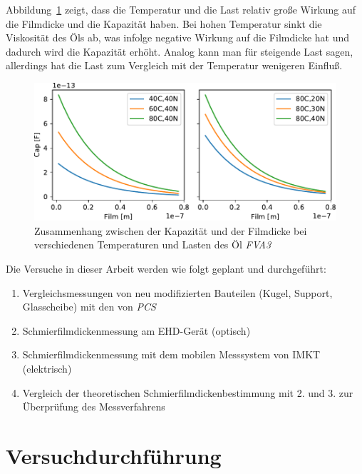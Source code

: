 Abbildung~\ref{fig:film_cap_with_dif_temp_and_load} zeigt, dass die Temperatur und die Last relativ große Wirkung auf die Filmdicke und die Kapazität haben.
Bei hohen Temperatur sinkt die Viskosität des Öls ab, was infolge negative Wirkung auf die Filmdicke hat und dadurch wird die Kapazität erhöht.
Analog kann man für steigende Last sagen, allerdings hat die Last zum Vergleich mit der Temperatur wenigeren Einfluß.
\begin{figure}[htb]
    \centering
    \includegraphics[]{./images/film_cap_with_dif_temp_and_load_fva3.pdf}
    \caption{Zusammenhang zwischen der Kapazität und der Filmdicke bei verschiedenen Temperaturen und Lasten des Öl \textit{FVA3}}
    \label{fig:film_cap_with_dif_temp_and_load}
\end{figure}

Die Versuche in dieser Arbeit werden wie folgt geplant und durchgeführt:
\begin{enumerate}
    \item Vergleichsmessungen von neu modifizierten Bauteilen (Kugel, Support, Glasscheibe) mit den von \textit{PCS}
    \item Schmierfilmdickenmessung am EHD-Gerät (optisch)
    \item Schmierfilmdickenmessung mit dem mobilen Messsystem von IMKT (elektrisch)
    \item Vergleich der theoretischen Schmierfilmdickenbestimmung mit 2. und 3. zur Überprüfung des Messverfahrens
\end{enumerate}

\section{Versuchdurchführung}
\label{sec:versuchdurchfuehrung}

